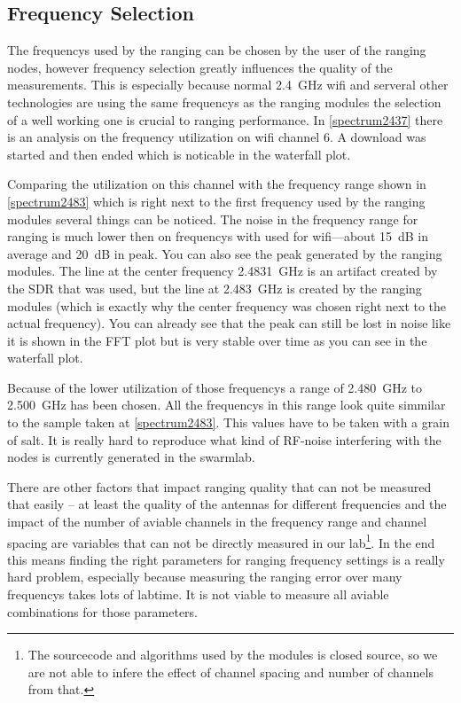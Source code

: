 \subsection{Frequency Selection}
The frequencys used by the ranging can be chosen by the user of the ranging nodes,
however frequency selection greatly influences the quality of the measurements.
This is especially because normal \SI{2.4}{\giga\hertz} wifi and serveral other technologies are using the same frequencys as the ranging modules the selection of a well working one is crucial to ranging performance.
In \autoref{spectrum2437} there is an analysis on the frequency utilization on wifi channel 6.
A download was started and then ended which is noticable in the waterfall plot.

Comparing the utilization on this channel with the frequency range shown in \autoref{spectrum2483} which is right next to the first frequency used by the ranging modules several things can be noticed.
The noise in the frequency range for ranging is much lower then on frequencys with used for wifi—about \SI{15}{dB} in average and \SI{20}{dB} in peak.
You can also see the peak generated by the ranging modules.
The line at the center frequency \SI{2.4831}{\giga\hertz} is an artifact created by the SDR that was used, but the line at \SI{2.483}{\giga\hertz} is created by the ranging modules (which is exactly why the center frequency was chosen right next to the actual frequency).
You can already see that the peak can still be lost in noise like it is shown in the FFT plot but is very stable over time as you can see in the waterfall plot.

Because of the lower utilization of those frequencys a range of \SI{2.480}{\giga\hertz} to \SI{2.500}{\giga\hertz} has been chosen.
All the frequencys in this range look quite simmilar to the sample taken at \autoref{spectrum2483}.
This values have to be taken with a grain of salt.
It is really hard to reproduce what kind of RF-noise interfering with the nodes is currently generated in the swarmlab.

There are other factors that impact ranging quality that can not be measured that easily – at least the quality of the antennas for different frequencies and the impact of the number of aviable channels in the frequency range and channel spacing are variables that can not be directly measured in our lab\footnote{The sourcecode and algorithms used by the modules is closed source, so we are not able to infere the effect of channel spacing and number of channels from that.}. 
In the end this means finding the right parameters for ranging frequency settings is a really hard problem, especially because measuring the ranging error over many frequencys takes lots of labtime. 
It is not viable to measure all aviable combinations for those parameters.


